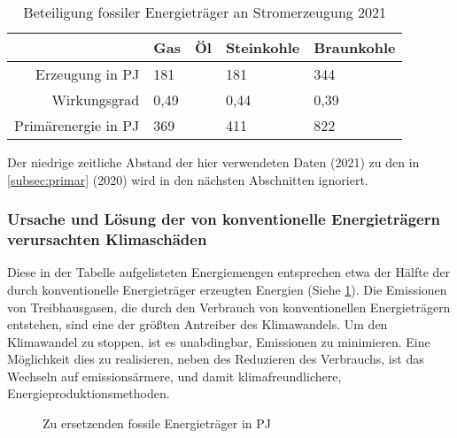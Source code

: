 \documentclass[12pt, ngerman]{article}
\newcommand{\pe}{_{\mathrm{PE}}}
\newcommand{\el}{_{\mathrm{el}}}
\begin{document}
\begin{table}[!h]
    \begin{tabular}{r|llll}
        \toprule
                                           & Gas  & Öl & Steinkohle & Braunkohle \\
        \midrule
        Erzeugung in \unit{PJ\el}          & 181  &    & 181        & 344        \\
        Wirkungsgrad \protect\footnotemark & 0,49 &    & 0,44       & 0,39       \\
        \midrule
        Primärenergie in \unit{PJ\pe}      & 369  &    & 411        & 822        \\
        \bottomrule
    \end{tabular}
    \caption{Beteiligung fossiler Energieträger an Stromerzeugung 2021}
\end{table}

Der niedrige zeitliche Abstand der hier verwendeten Daten (2021) zu den in \cref{subsec:primar} (2020)
wird in den nächsten Abschnitten ignoriert.

\subsubsection{Ursache und Lösung der von konventionelle Energieträgern verursachten Klimaschäden}

Diese in der Tabelle aufgelisteten Energiemengen entsprechen etwa der Hälfte
der durch konventionelle Energieträger erzeugten Energien (Siehe \cref{fig:kon}).
Die Emissionen von Treibhausgasen, die durch den Verbrauch von konventionellen Energieträgern
entstehen, sind eine der größten Antreiber des Klimawandels.
Um den Klimawandel zu stoppen, ist es unabdingbar, Emissionen zu minimieren.
Eine Möglichkeit dies zu realisieren, neben des Reduzieren des Verbrauchs,
ist das Wechseln auf emissionsärmere, und damit klimafreundlichere,
Energieproduktionsmethoden. %

\begin{figure}[!h]
    \caption{Zu ersetzenden fossile Energieträger in \unit{PJ\pe}}
    \label{fig:kon}
\end{figure}
\end{document}
